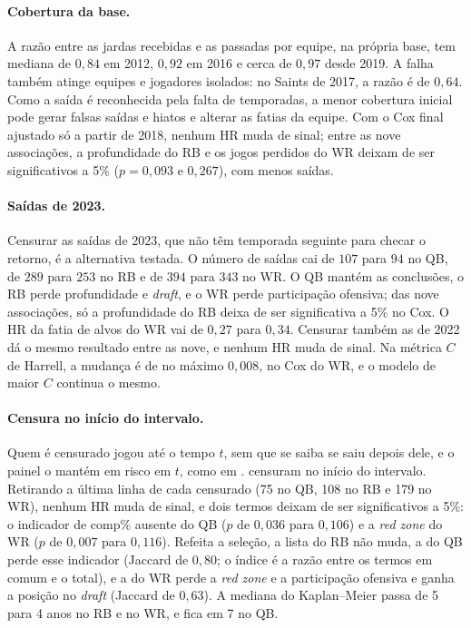 \paragraph{Cobertura da base.}
A razão entre as jardas recebidas e as passadas por equipe, na própria base, tem mediana de $0{,}84$ em 2012, $0{,}92$ em 2016 e cerca de $0{,}97$ desde 2019. A falha também atinge equipes e jogadores isolados: no Saints de 2017, a razão é de $0{,}64$. Como a saída é reconhecida pela falta de temporadas, a menor cobertura inicial pode gerar falsas saídas e hiatos e alterar as fatias da equipe. Com o Cox final ajustado só a partir de 2018, nenhum HR muda de sinal; entre as nove associações, a profundidade do RB e os jogos perdidos do WR deixam de ser significativos a 5\% ($p=0{,}093$ e $0{,}267$), com menos saídas.

\paragraph{Saídas de 2023.}\label{subsec:apend_2023}
Censurar as saídas de 2023, que não têm temporada seguinte para checar o retorno, é a alternativa testada. O número de saídas cai de $107$ para $94$ no QB, de $289$ para $253$ no RB e de $394$ para $343$ no WR. O QB mantém as conclusões, o RB perde profundidade e \textit{draft}, e o WR perde participação ofensiva; das nove associações, só a profundidade do RB deixa de ser significativa a 5\% no Cox. O HR da fatia de alvos do WR vai de $0{,}27$ para $0{,}34$. Censurar também as de 2022 dá o mesmo resultado entre as nove, e nenhum HR muda de sinal. Na métrica $C$ de Harrell, a mudança é de no máximo $0{,}008$, no Cox do WR, e o modelo de maior $C$ continua o mesmo.

\paragraph{Censura no início do intervalo.}\label{subsec:apend_censura_inicio}
Quem é censurado jogou até o tempo $t$, sem que se saiba se saiu depois dele, e o painel o mantém em risco em $t$, como em \citet{ducking2015}. \citet{prentice1978} censuram no início do intervalo. Retirando a última linha de cada censurado (75 no QB, 108 no RB e 179 no WR), nenhum HR muda de sinal, e dois termos deixam de ser significativos a 5\%: o indicador de comp\% ausente do QB ($p$ de $0{,}036$ para $0{,}106$) e a \textit{red zone} do WR ($p$ de $0{,}007$ para $0{,}116$). Refeita a seleção, a lista do RB não muda, a do QB perde esse indicador (Jaccard de $0{,}80$; o índice é a razão entre os termos em comum e o total), e a do WR perde a \textit{red zone} e a participação ofensiva e ganha a posição no \textit{draft} (Jaccard de $0{,}63$). A mediana do Kaplan--Meier passa de 5 para 4 anos no RB e no WR, e fica em 7 no QB.

